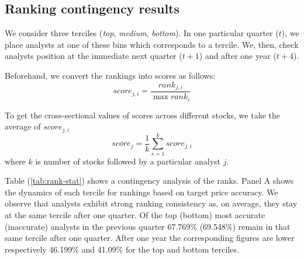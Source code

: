 \documentclass{article}\usepackage[]{graphicx}\usepackage[]{color}
\begin{document}
\subsection{Ranking contingency results}
We consider  three terciles (\textit{top}, \textit{medium}, \textit{bottom}). In one particular quarter ($t$), we place  analysts at one of these bins which corresponds to a tercile. We, then,  check analysts position at the immediate next quarter ($t+1$) and after one year ($t+4$).   

Beforehand, we convert the rankings into scores as follows:
\begin{equation}
\label{eq:score}
score_{j,i}=\frac{rank_{j,i}}{\max{rank_i}}
\end{equation}

To get the cross-sectional values of scores across different stocks, we take the average of $score_{j,i}$
\begin{equation}
\label{eq:mean-score}
\overline{score_{j}}= \frac{1}{k} \sum_{s=1}^{k} score_{j,i}
\end{equation}
where $k$ is number of stocks followed by a particular analyst $j$. 

Table (\ref{tab:rank-stat}) shows a contingency analysis of the ranks. 
Panel A shows the dynamics of each tercile for rankings based on target price  accuracy. We observe that analysts exhibit strong ranking consistency as, on average, they stay at the same tercile after one quarter. Of the top (bottom) most accurate (inaccurate) analysts in the previous quarter 67.769\% (69.548\%) remain in that same tercile after one quarter. After one year the corresponding figures are lower respectively 46.199\% and 41.09\% for the top and bottom terciles. 
\end{document}
